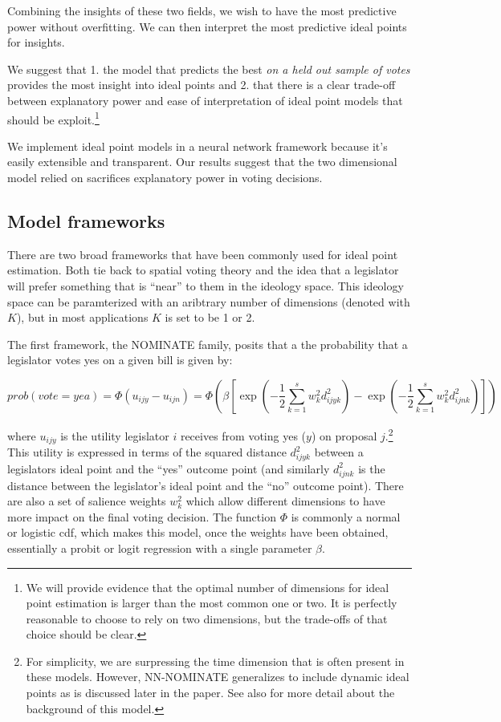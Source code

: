 \documentclass[11pt,]{article}
\begin{document}
Combining the insights of these two fields, we wish to have the most
predictive power without overfitting. We can then interpret the most
predictive ideal points for insights.

We suggest that 1. the model that predicts the best \emph{on a held out
sample of votes} provides the most insight into ideal points and 2. that
there is a clear trade-off between explanatory power and ease of
interpretation of ideal point models that should be exploit.\footnote{We
  will provide evidence that the optimal number of dimensions for ideal
  point estimation is larger than the most common one or two. It is
  perfectly reasonable to choose to rely on two dimensions, but the
  trade-offs of that choice should be clear.}

We implement ideal point models in a neural network framework because
it's easily extensible and transparent. Our results suggest that the two
dimensional model relied on sacrifices explanatory power in voting
decisions.

\subsection{Model frameworks}\label{model-frameworks}

There are two broad frameworks that have been commonly used for ideal
point estimation. Both tie back to spatial voting theory and the idea
that a legislator will prefer something that is ``near'' to them in the
ideology space. This ideology space can be paramterized with an
aribtrary number of dimensions (denoted with \(K\)), but in most
applications \(K\) is set to be 1 or 2.

The first framework, the NOMINATE family, posits that a the probability
that a legislator votes yes on a given bill is given by:

\begin{equation}\label{eq:wnom}
prob(vote=yea) = \Phi\left(u_{ijy} - u_{ijn}\right) = \Phi\left(\beta \left[\exp\left(-\frac{1}{2}\sum_{k=1}^s w_k^2 d_{ijyk}^2 \right) - \exp\left({-\frac{1}{2}\sum_{k=1}^s w_k^2 d_{ijnk}^2 }\right)\right]\right)
\end{equation}

\noindent
where \(u_{ijy}\) is the utility legislator \(i\) receives from voting
yes (\(y\)) on proposal \(j\).\footnote{For simplicity, we are
  surpressing the time dimension that is often present in these models.
  However, NN-NOMINATE generalizes to include dynamic ideal points as is
  discussed later in the paper. See also \cite{carroll2009measuring} for
  more detail about the background of this model.} This utility is
expressed in terms of the squared distance \(d_{ijyk}^2\) between a
legislators ideal point and the ``yes'' outcome point (and similarly
\(d_{ijnk}^2\) is the distance between the legislator's ideal point and
the ``no'' outcome point). There are also a set of salience weights
\(w_k^2\) which allow different dimensions to have more impact on the
final voting decision. The function \(\Phi\) is commonly a normal or
logistic cdf, which makes this model, once the weights have been
obtained, essentially a probit or logit regression with a single
parameter \(\beta.\)
\end{document}
